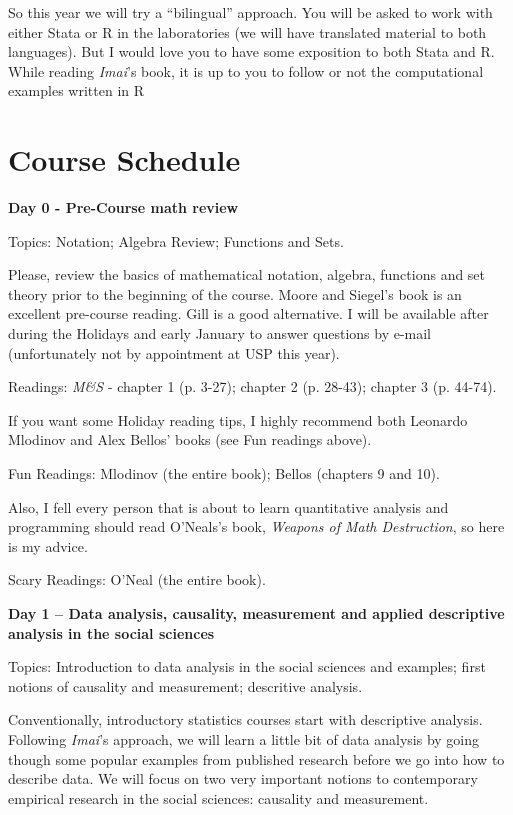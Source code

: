 \documentclass[a4paper,11pt]{article}
\begin{document}
So this year we will try a ``bilingual'' approach. You will be asked to work with either Stata or R in the laboratories (we will have translated material to both languages). But I would love you to have some exposition to both Stata and R. While reading \emph{Imai}'s book, it is up to you to follow or not the computational examples written in R

\pagebreak
\section{Course Schedule}

\textbf{Day 0 - Pre-Course math review}

Topics: Notation; Algebra Review; Functions and Sets.

Please, review the basics of mathematical notation, algebra, functions and set theory prior to the beginning of the course. Moore and Siegel's book is an excellent pre-course reading. Gill is a good alternative. I will be available after during the Holidays and early January to answer questions by e-mail (unfortunately not by appointment at USP this year).

Readings: \emph{M\&S} - chapter 1 (p. 3-27); chapter 2 (p. 28-43); chapter 3 (p. 44-74).

If you want some Holiday reading tips, I highly recommend both Leonardo Mlodinov and Alex Bellos' books (see Fun readings above).

Fun Readings: Mlodinov (the entire book); Bellos (chapters 9 and 10).

Also, I fell every person that is about to learn quantitative analysis and programming should read O'Neals's book, \emph{Weapons of Math Destruction}, so here is my advice.

Scary Readings: O'Neal (the entire book).

\textbf{Day 1 -- Data analysis, causality, measurement and applied descriptive analysis in the social sciences}

Topics: Introduction to data analysis in the social sciences and examples; first notions of causality and measurement; descritive analysis.

Conventionally, introductory statistics courses start with descriptive analysis. Following \emph{Imai}'s approach, we will learn a little bit of data analysis by going though some popular examples from published research before we go into how to describe data. We will focus on two very important notions to contemporary empirical research in the social sciences: causality and measurement. 
\end{document}
